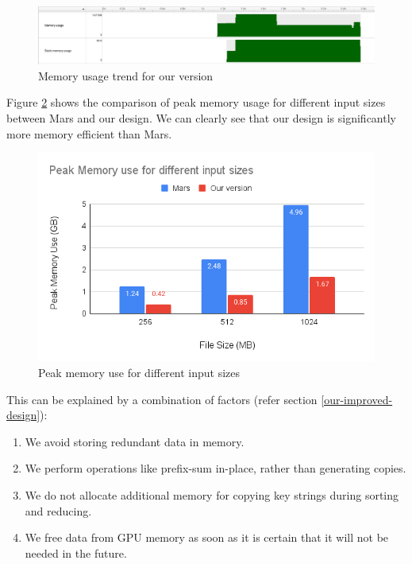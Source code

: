 \documentclass{article}
\begin{document}
\begin{figure}
    \centering
    \includegraphics[width=1\linewidth]{images/mr-our-memory.png}
    \caption{Memory usage trend for our version}
    \label{fig:mr-our-memory}
\end{figure}

Figure \ref{fig:mr-peak-memory} shows the comparison of peak memory usage for different input sizes between Mars and our design. We can clearly see that our design is significantly more memory efficient than Mars.
\begin{figure}
    \centering
    \includegraphics[width=1\linewidth]{images/mr-peak-memory.png}
    \caption{Peak memory use for different input sizes}
    \label{fig:mr-peak-memory}
\end{figure}

This can be explained by a combination of factors (refer section \ref{our-improved-design}):
\begin{enumerate}
    \item We avoid storing redundant data in memory.
    \item We perform operations like prefix-sum in-place, rather than generating copies.
    \item We do not allocate additional memory for copying key strings during sorting and reducing.
    \item We free data from GPU memory as soon as it is certain that it will not be needed in the future.
\end{enumerate}
\end{document}

